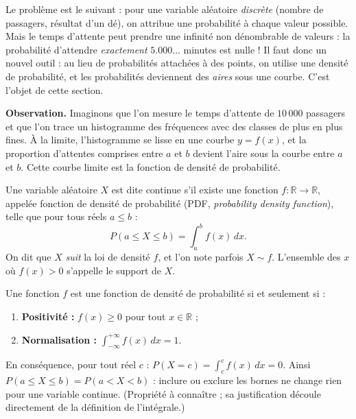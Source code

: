 \documentclass[11pt]{article}
\newcommand{\cle}[1]{{\popxbold\color{popdark}#1}}
\newcounter{popsec}
\newcounter{popsub}
\newcommand{\courssub}[1]{%
  \stepcounter{popsub}%
  \par\vspace{9pt}\noindent{\popxbold\fontsize{11.5}{13}\selectfont\color{popink}{\color{poporange}\thepopsec.\thepopsub}\hspace{6pt}#1}\par\nopagebreak\vspace{4pt}
}
\begin{document}
Le problème est le suivant : pour une variable aléatoire \emph{discrète} (nombre de passagers, résultat d'un dé), on attribue une probabilité à chaque valeur possible. Mais le temps d'attente peut prendre une infinité non dénombrable de valeurs : la probabilité d'attendre \emph{exactement} $5.000\ldots$ minutes est nulle ! Il faut donc un nouvel outil : au lieu de probabilités attachées à des points, on utilise une \cle{densité de probabilité}, et les probabilités deviennent des \emph{aires} sous une courbe. C'est l'objet de cette section.

\courssub{De l'intuition à la définition}

\textbf{Observation.} Imaginons que l'on mesure le temps d'attente de $10\,000$ passagers et que l'on trace un histogramme des fréquences avec des classes de plus en plus fines. À la limite, l'histogramme se lisse en une courbe $y = f(x)$, et la proportion d'attentes comprises entre $a$ et $b$ devient l'aire sous la courbe entre $a$ et $b$. Cette courbe limite est la \cle{fonction de densité de probabilité}.

\begin{definition}
Une variable aléatoire $X$ est dite \cle{continue} s'il existe une fonction $f : \mathbb{R} \to \mathbb{R}$, appelée \cle{fonction de densité de probabilité} (PDF, \emph{probability density function}), telle que pour tous réels $a \leq b$ :
\[ P(a \leq X \leq b) = \int_a^b f(x)\, dx. \]
On dit que $X$ \emph{suit} la loi de densité $f$, et l'on note parfois $X \sim f$. L'ensemble des $x$ où $f(x) > 0$ s'appelle le \cle{support} de $X$.
\end{definition}

\begin{propriete}
Une fonction $f$ est une fonction de densité de probabilité si et seulement si :
\begin{enumerate}
\item \textbf{Positivité :} $f(x) \geq 0$ pour tout $x \in \mathbb{R}$ ;
\item \textbf{Normalisation :} $\displaystyle \int_{-\infty}^{+\infty} f(x)\, dx = 1$.
\end{enumerate}
En conséquence, pour tout réel $c$ : $P(X = c) = \displaystyle\int_c^c f(x)\,dx = 0$. Ainsi $P(a \leq X \leq b) = P(a < X < b)$ : inclure ou exclure les bornes ne change rien pour une variable continue. (Propriété à connaître ; sa justification découle directement de la définition de l'intégrale.)
\end{propriete}
\end{document}
